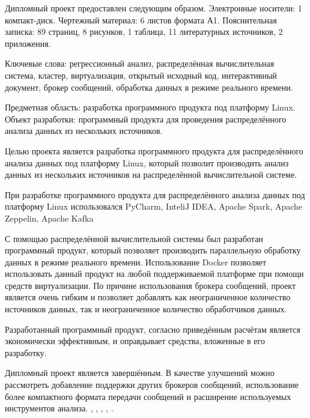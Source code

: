 \label{sec:ref}

Дипломный проект предоставлен следующим образом. Электронные носители: 1
компакт-диск. Чертежный материал: 6 листов формата А1. Пояснительная записка:
89 страниц, 8 рисунков, 1 таблица, 11 литературных источников, 2 приложения.

Ключевые слова: регрессионный анализ, распределённая вычислительная система, кластер, виртуализация, открытый исходный код, интерактивный документ, брокер сообщений, обработка данных в режиме реального времени.

Предметная область: разработка программного продукта под платформу Linux.
Объект разработки: программный продукта для проведения распределённого анализа данных из нескольких источников.

Целью проекта является разработка программного продукта для распределённого анализа данных под платформу Linux, который позволит производить анализ данных из нескольких источников на распределённой вычислительной системе.

При разработке программного продукта для распределённого анализа данных под платформу Linux использовался PyCharm, InteliJ IDEA, Apache Spark, Apache Zeppelin, Apache Kafka

С помощью распределённой вычислительной системы был разработан программный продукт, который позволяет производить параллельную обработку данных в режиме реального времени.
Использование Docker позволяет использовать данный продукт на любой поддерживаемой платформе при помощи средств виртуализации.
По причине использования брокера сообщений, проект является очень гибким и позволяет добавлять как неограниченное количество источников данных, так и неограниченное количество обработчиков данных.

Разработанный программный продукт, согласно приведённым расчётам является экономически эффективным, и оправдывает средства, вложенные в его разработку.

Дипломный проект является завершённым. В качестве улучшений можно рассмотреть добавление поддержки других брокеров сообщений, использование более компактного формата передачи сообщений и расширение используемых инструментов анализа.
\insertNumPagesText ,
\insertNumFiguresText , \insertNumTablesText ,
\insertNumBibElementsText ,
\insertNumAnnexesText .

\newpage
